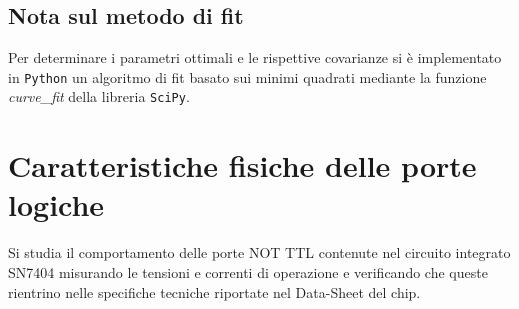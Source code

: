 \documentclass[10pt, a4paper, italian]{article}
\begin{document}
\subsection*{Nota sul metodo di fit}
Per determinare i parametri ottimali e le rispettive covarianze si \`e
implementato in \verb+Python+ un algoritmo di fit basato sui minimi quadrati
mediante la funzione \emph{curve\_fit} della libreria \texttt{SciPy}.

\section{Caratteristiche fisiche delle porte logiche}
Si studia il comportamento delle porte NOT TTL contenute nel circuito integrato
SN7404 misurando le tensioni e correnti di operazione e verificando che queste
rientrino nelle specifiche tecniche riportate nel Data-Sheet del chip.
\end{document}
